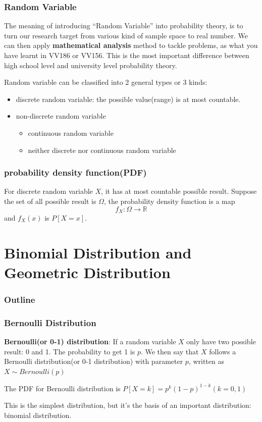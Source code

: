 \documentclass{beamer}
\begin{document}
\begin{frame}
    \frametitle{Random Variable}
    The meaning of introducing ``Random Variable'' into probability theory, is to turn our research target from various kind of sample space to real number. We can then apply \textbf{mathematical analysis} method to tackle problems, as what you have learnt in VV186 or VV156. This is the most important difference between high school level and university level probability theory.\par
    Random variable can be classified into 2 general types or 3 kinds:
    \begin{itemize}
        \item discrete random variable: the possible value(range) is at most countable.
        \item non-discrete random variable
        \begin{itemize}
            \item continuous random variable
            \item neither discrete nor continuous random variable
        \end{itemize}
    \end{itemize}
    
\end{frame}

\begin{frame}
    \frametitle{probability density function(PDF)}
    For discrete random variable $X$, it has at most countable possible result. Suppose the set of all possible result is $\varOmega$, the probability density function is a map
    \[f_{X}: \varOmega\rightarrow \mathbb{R}\]
    and $f_{X}(x)$ is $P[X=x]$.

\end{frame}

\section{Binomial Distribution and Geometric Distribution}
\begin{frame}
    \frametitle{Outline}
    \tableofcontents[currentsection]
\end{frame}

\begin{frame}
    \frametitle{Bernoulli Distribution}
    \textbf{Bernoulli(or 0-1) distribution}: If a random variable $X$ only have two possible result: 0 and 1. The probability to get 1 is $p$. We then say that $X$ follows a Bernoulli distribution(or 0-1 distribution) with parameter $p$, written as $X\sim Bernoulli(p)$\par
    The PDF for Bernoulli distribution is $P[X=k]=p^{k}(1-p)^{1-k}(k=0,1)$\par
    This is the simplest distribution, but it's the basis of an important distribution: binomial distribution.\par

    

\end{frame}
\end{document}
